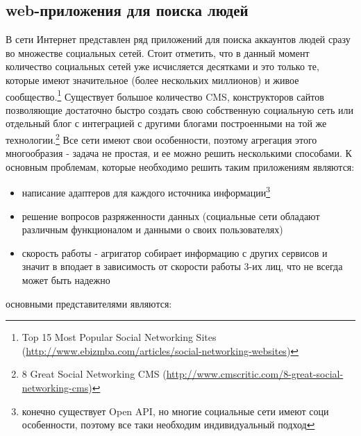 \subsection{web-приложения для поиска людей}
В сети Интернет представлен ряд приложений для поиска аккаунтов людей сразу во множестве социальных сетей. Стоит отметить, что в данный момент количество социальных сетей уже исчисляется десятками и это только те, которые имеют значительное (более нескольких миллионов) и живое сообщество.\footnote{Top 15 Most Popular Social Networking Sites (\url{http://www.ebizmba.com/articles/social-networking-websites})}
 Существует большое количество CMS,%
конструкторов сайтов позволяющие достаточно быстро создать свою собственную социальную сеть или отдельный блог с интеграцией с другими блогами построенными на той же технологии.\footnote{8 Great Social Networking CMS (\url{http://www.cmscritic.com/8-great-social-networking-cms})} 
Все сети имеют свои особенности,  поэтому агрегация этого многообразия - задача не простая, и ее можно решить несколькими способами. К основным проблемам, которые необходимо решить таким приложениям являются:
\begin{itemize}
\item написание адаптеров для каждого источника информации\footnote{конечно существует Open API, но многие социальные сети имеют соци особенности, поэтому все таки необходим индивидуальный подход}
\item решение вопросов разряженности данных (социальные сети обладают различным функционалом и данными о своих пользователях)
\item скорость работы - агригатор собирает информацию с других сервисов и значит в вподает в зависимость от скорости работы 3-их лиц, что не всегда может быть надежно
\end{itemize}
основными представителями являются:
